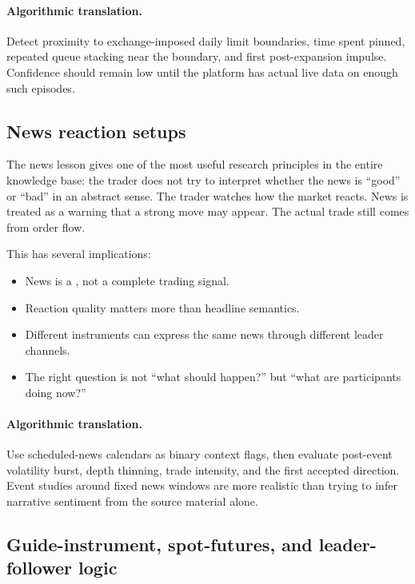 \paragraph{Algorithmic translation.}
Detect proximity to exchange-imposed daily limit boundaries, time spent pinned, repeated queue
stacking near the boundary, and first post-expansion impulse. Confidence should remain low until
the platform has actual live data on enough such episodes.

\subsection{News reaction setups}

The news lesson gives one of the most useful research principles in the entire knowledge base:
the trader does not try to interpret whether the news is ``good'' or ``bad'' in an abstract
sense. The trader watches how the market reacts. News is treated as a warning that a strong move
may appear. The actual trade still comes from order flow.

This has several implications:

\begin{itemize}[leftmargin=1.4em]
  \item News is a , not a complete trading signal.
  \item Reaction quality matters more than headline semantics.
  \item Different instruments can express the same news through different leader channels.
  \item The right question is not ``what should happen?'' but ``what are participants doing now?''
\end{itemize}

\paragraph{Algorithmic translation.}
Use scheduled-news calendars as binary context flags, then evaluate post-event volatility burst,
depth thinning, trade intensity, and the first accepted direction. Event studies around fixed
news windows are more realistic than trying to infer narrative sentiment from the source
material alone.

\subsection{Guide-instrument, spot-futures, and leader-follower logic}

